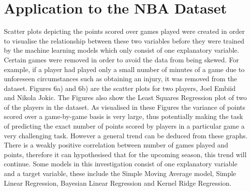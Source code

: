 \documentclass[a4paper,11pt,twoside]{article}
\begin{document}
\newpage

\section{Application to the NBA Dataset}

Scatter plots depicting the points scored over games played were created in order to visualise the relationship between these two variables before they were trained by the machine learning models which only consist of one explanatory variable. Certain games were removed in order to avoid the data from being skewed. For example, if a player had played only a small number of minutes of a game due to unforeseen circumstances such as obtaining an injury, it was removed from the dataset. Figures 6a) and 6b) are the scatter plots for two players, Joel Embiid and Nikola Jokic. The Figures also show the Least Squares Regression plot of two of the players in the dataset. As visualised in these Figures the variance of points scored over a game-by-game basis is very large, thus potentially making the task of predicting the exact number of points scored by players in a particular game a very challenging task. However a general trend can be deduced from these graphs. There is a weakly positive correlation between number of games played and points, therefore it can hypothesised that for the upcoming season, this trend will continue. Some models in this investigation consist of one explanatory variable and a target variable, these include the Simple Moving Average model, Simple Linear Regression, Bayesian Linear Regression and Kernel Ridge Regression.
\end{document}
